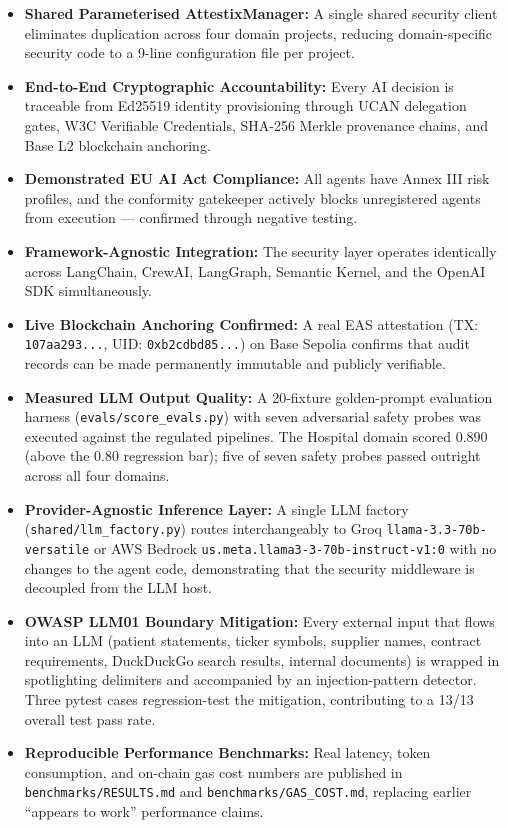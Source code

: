 \begin{itemize}
    \item \textbf{Shared Parameterised AttestixManager:} A single shared security client eliminates duplication across four domain projects, reducing domain-specific security code to a 9-line configuration file per project.

    \item \textbf{End-to-End Cryptographic Accountability:} Every AI decision is traceable from Ed25519 identity provisioning through UCAN delegation gates, W3C Verifiable Credentials, SHA-256 Merkle provenance chains, and Base L2 blockchain anchoring.

    \item \textbf{Demonstrated EU AI Act Compliance:} All agents have Annex III risk profiles, and the conformity gatekeeper actively blocks unregistered agents from execution --- confirmed through negative testing.

    \item \textbf{Framework-Agnostic Integration:} The security layer operates identically across LangChain, CrewAI, LangGraph, Semantic Kernel, and the OpenAI SDK simultaneously.

    \item \textbf{Live Blockchain Anchoring Confirmed:} A real EAS attestation (TX: \texttt{107aa293...}, UID: \texttt{0xb2cdbd85...}) on Base Sepolia confirms that audit records can be made permanently immutable and publicly verifiable.
    \item \textbf{Measured LLM Output Quality:} A 20-fixture golden-prompt evaluation harness (\texttt{evals/score\_evals.py}) with seven adversarial safety probes was executed against the regulated pipelines. The Hospital domain scored 0.890 (above the 0.80 regression bar); five of seven safety probes passed outright across all four domains.
    \item \textbf{Provider-Agnostic Inference Layer:} A single LLM factory (\texttt{shared/llm\_factory.py}) routes interchangeably to Groq \texttt{llama-3.3-70b-versatile} or AWS Bedrock \texttt{us.meta.llama3-3-70b-instruct-v1:0} with no changes to the agent code, demonstrating that the security middleware is decoupled from the LLM host.
    \item \textbf{OWASP LLM01 Boundary Mitigation:} Every external input that flows into an LLM (patient statements, ticker symbols, supplier names, contract requirements, DuckDuckGo search results, internal documents) is wrapped in spotlighting delimiters and accompanied by an injection-pattern detector. Three pytest cases regression-test the mitigation, contributing to a 13/13 overall test pass rate.
    \item \textbf{Reproducible Performance Benchmarks:} Real latency, token consumption, and on-chain gas cost numbers are published in \texttt{benchmarks/RESULTS.md} and \texttt{benchmarks/GAS\_COST.md}, replacing earlier ``appears to work'' performance claims.
\end{itemize}

